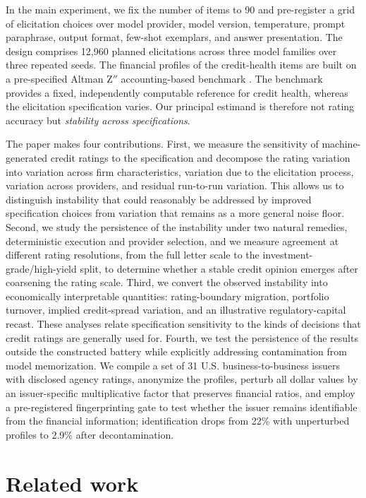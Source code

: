\documentclass[pdflatex,sn-nature,lineno]{sn-jnl}
\theoremstyle{thmstyleone}
\begin{document}
In the main experiment, we fix the number of items to 90 and pre-register a grid of elicitation choices
over model provider, model version, temperature, prompt paraphrase, output format, few-shot exemplars,
and answer presentation. The design comprises 12{,}960 planned elicitations across three model families
over three repeated seeds. The financial profiles of the credit-health items are built on a pre-specified
Altman Z$''$ accounting-based benchmark \cite{altman1968}. The benchmark provides a fixed, independently
computable reference for credit health, whereas the elicitation specification varies. Our principal
estimand is therefore not rating accuracy but \emph{stability across specifications}.

The paper makes four contributions. First, we measure the sensitivity of machine-generated credit
ratings to the specification and decompose the rating variation into variation across firm
characteristics, variation due to the elicitation process, variation across providers, and residual
run-to-run variation. This allows us to distinguish instability that could reasonably be addressed by
improved specification choices from variation that remains as a more general noise floor. Second, we
study the persistence of the instability under two natural remedies, deterministic execution and provider
selection, and we measure agreement at different rating resolutions, from the full letter scale to the
investment-grade/high-yield split, to determine whether a stable credit opinion emerges after coarsening
the rating scale. Third, we convert the observed instability into economically interpretable quantities:
rating-boundary migration, portfolio turnover, implied credit-spread variation, and an illustrative
regulatory-capital recast. These analyses relate specification sensitivity to the kinds of decisions that
credit ratings are generally used for. Fourth, we test the persistence of the results outside the
constructed battery while explicitly addressing contamination from model memorization. We compile a set
of 31 U.S. business-to-business issuers with disclosed agency ratings, anonymize the profiles, perturb
all dollar values by an issuer-specific multiplicative factor that preserves financial ratios, and employ
a pre-registered fingerprinting gate to test whether the issuer remains identifiable from the financial
information; identification drops from 22\% with unperturbed profiles to 2.9\% after decontamination.

\section{Related work}
\end{document}
